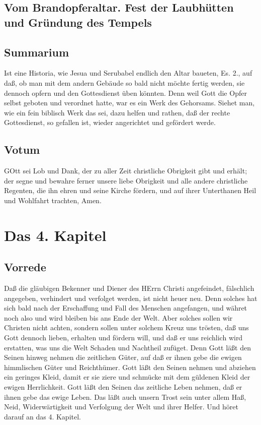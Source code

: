 \section[Vom Brandopferaltar. Fest der Laubhütten und Gründung des]{Vom Brandopferaltar. Fest der Laubhütten und Gründung des Tempels}


\section{Summarium}

Ist eine Historia, wie Jesua und Serubabel endlich den Altar baueten, Es. 2., auf daß, ob man mit dem andern Gebäude so bald nicht möchte fertig werden, sie dennoch opfern und den Gottesdienst üben könnten. Denn weil Gott die Opfer selbst geboten und verordnet hatte, war es ein Werk des Gehorsams. Siehet man, wie ein fein biblisch Werk das sei, dazu helfen und rathen, daß der rechte Gottesdienst, so gefallen ist, wieder angerichtet und gefördert werde.

\section{Votum}

GOtt sei Lob und Dank, der zu aller Zeit christliche Obrigkeit gibt und erhält; der segne und bewahre ferner unsere liebe Obrigkeit und alle andere christliche Regenten, die ihn ehren und seine Kirche fördern, und auf ihrer Unterthanen Heil und Wohlfahrt trachten, Amen.

\chapter{Das 4. Kapitel}

\section{Vorrede}

Daß die gläubigen Bekenner und Diener des HErrn Christi angefeindet, fälschlich angegeben, verhindert und verfolget werden, ist nicht heuer neu. Denn solches hat sich bald nach der Erschaffung und Fall des Menschen angefangen, und währet noch also und wird bleiben bis ans Ende der Welt. Aber solches sollen wir Christen nicht achten, sondern sollen unter solchem Kreuz uns trösten, daß uns Gott dennoch lieben, erhalten und fördern will, und daß er uns reichlich wird erstatten, was uns die Welt Schaden und Nachtheil zufüget. Denn Gott läßt den Seinen hinweg nehmen die zeitlichen Güter, auf daß er ihnen gebe die ewigen himmlischen Güter und Reichthümer. Gott läßt den Seinen nehmen und abziehen ein geringes Kleid, damit er sie ziere und schmücke mit dem güldenen Kleid der ewigen Herrlichkeit. Gott läßt den Seinen das zeitliche Leben nehmen, daß er ihnen gebe das ewige Leben. Das läßt auch unsern Trost sein unter allem Haß, Neid, Widerwärtigkeit und Verfolgung der Welt und ihrer Helfer. Und höret darauf an das 4. Kapitel.

